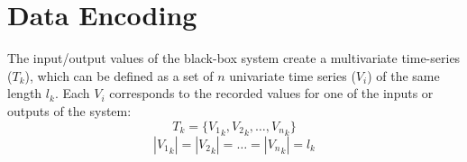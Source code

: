 

\section{Data Encoding}
The input/output values of the black-box system create a multivariate time-series ($T_k$), which can be defined as a set of $n$ univariate time series ($V_i$) of the same length $l_k$. Each $V_i$ corresponds to the recorded values for one of the inputs or outputs of the system:
\begin{equation} \label{eq:T_k}
    T_k = \{{V_1}_k, {V_2}_k, \ldots, {V_n}_k\}
\end{equation}
\begin{equation} \label{eq:l_k}
    |{V_1}_k|=|{V_2}_k|=\ldots=|{V_n}_k|=l_k 
\end{equation}

